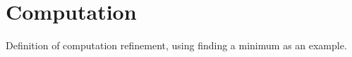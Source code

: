 \section{Computation}

Definition of computation refinement, using finding a minimum as an
example.
